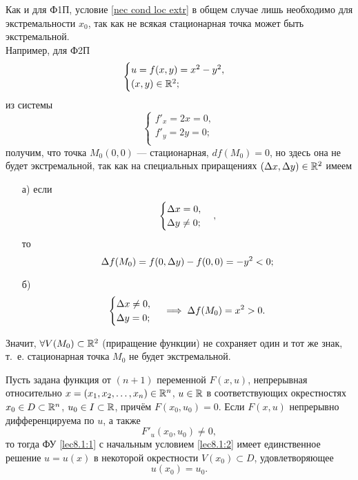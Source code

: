 \documentclass[../main.tex]{subfiles}
\begin{document}
\begin{rem}
		Как и для Ф1П, условие \eqref{nec cond loc extr} в общем случае
		лишь необходимо для экстремальности $x_0$, так как не всякая
		стационарная точка может быть экстремальной. \\
		Например, для Ф2П
		\[
		\begin{cases}
			u = f (x, y) = x^2 - y^2, \\
			(x, y) \in \mathbb{R}^2; \\
		\end{cases}
		\]
		из системы
		\[
		\begin{cases}
			f'_x = 2x = 0, \\
			f'_y = 2y = 0; \\
		\end{cases}
		\]
		получим, что точка $M_0 (0, 0)$ --- стационарная,
		$df (M_0) = 0$,
		но здесь она не будет экстремальной, так как на специальных приращениях
		$(\Delta x, \Delta y) \in \mathbb{R}^2$ имеем
		\begin{enumerate}
			\item[а)]
			если
			\[
			\begin{cases}
				\Delta x = 0, \\
				\Delta y \ne 0; \\
			\end{cases},
			\]
			то
			\[
				\Delta f (M_0)
				= f (0, \Delta y) - f (0, 0)
				= -y^2 < 0;
			\]
			
			\item[б)]
			\[
			\begin{cases}
				\Delta x \ne 0, \\
				\Delta y = 0; \\
			\end{cases}
			\implies
			\Delta f (M_0)
			= x^2 > 0.
			\]
		\end{enumerate}
		Значит, $\forall V (M_0) \subset \mathbb{R}^2$ (приращение функции)
		не сохраняет один и тот же знак, т.~е. стационарная точка $M_0$
		не будет экстремальной.
	\end{rem}
\begin{thm}
		Пусть задана функция от $(n+1)$ переменной $F(x, u)$, непрерывная 
		относительно $x = (x_1, x_2, \ldots,
	 	x_n) \in \mathbb{R}^n$, $u \in \mathbb{R}$ в соответствующих окрестностях $x_0 \in D 
	 	\subset \mathbb{R}^n$, $u_0 \in I \subset \mathbb{R}$, причём $F(x_0,u_0)=0$. Если $F(x,u)$ 
	 	непрерывно дифференцируема по $u$, а также 
		\begin{equation}
			F'_u(x_0, u_0) \ne 0, \label{lec8.1:4}
		\end{equation}
		то тогда ФУ \eqref{lec8.1:1} с начальным условием \eqref{lec8.1:2} имеет 
		единственное решение $u = u(x)$ в некоторой окрестности $V(x_0) 
		\subset D$, удовлетворяющее
	 	\begin{equation}
			u(x_0) = u_0. \label{lec8.1:5}
		\end{equation}
	 \end{thm}
\end{document}
